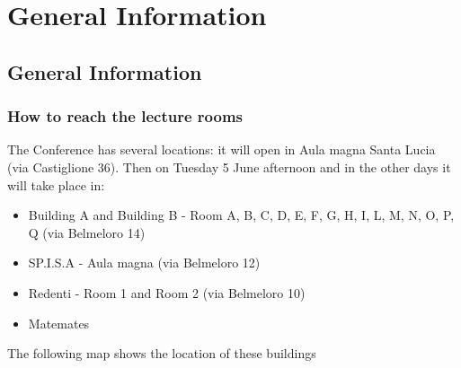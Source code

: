 
\part{General Information}


\chapter*{General Information}



\section*{How to reach the lecture rooms}
The Conference has several locations: it will open in Aula magna Santa Lucia (via Castiglione 36).
Then on Tuesday 5 June afternoon and in the other days it will take place in:
\begin{itemize}
\item Building A and Building B - Room A, B, C, D, E, F, G, H, I, L, M, N, O, P, Q (via Belmeloro 14)
\item SP.I.S.A - Aula magna (via Belmeloro 12)
\item Redenti - Room 1 and Room 2 (via Belmeloro 10)
\item Matemates
\end{itemize}
The following map shows the location of these buildings

